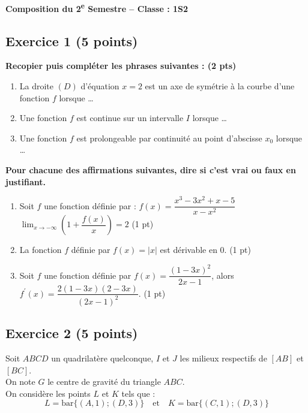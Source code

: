 \documentclass[12pt,a4paper]{article}
\begin{document}
\begin{center}
    \large\textbf{Composition du 2\textsuperscript{e} Semestre -- Classe : 1S2}
\end{center}

\hrulefill

\subsection*{Exercice 1 \hfill (5 points)}

\noindent\textbf{Recopier puis compléter les phrases suivantes : (2 pts)}
\begin{enumerate}
    \item[a)] La droite $(D)$ d'équation $x=2$ est un axe de symétrie à la courbe d'une fonction $f$ lorsque \dots
    \item[b)] Une fonction $f$ est continue sur un intervalle $I$ lorsque \dots
    \item[c)] Une fonction $f$ est prolongeable par continuité au point d'abscisse $x_{0}$ lorsque \dots
\end{enumerate}

\noindent\textbf{Pour chacune des affirmations suivantes, dire si c'est vrai ou faux en justifiant.}
\begin{enumerate}
    \item[\textbf{1.}] Soit $f$ une fonction définie par : $f(x)=\dfrac{x^{3}-3x^{2}+x-5}{x-x^{2}}$ \\
    $\lim_{x\rightarrow-\infty}\left(1+\dfrac{f(x)}{x}\right)=2$ \hfill (1 pt)
    
    \item[\textbf{2.}] La fonction $f$ définie par $f(x)=|x|$ est dérivable en 0. \hfill (1 pt)
    
    \item[\textbf{3.}] Soit $f$ une fonction définie par $f(x)=\dfrac{(1-3x)^{2}}{2x-1}$, alors $f^{\prime}(x)=\dfrac{2(1-3x)(2-3x)}{(2x-1)^{2}}$. \hfill (1 pt)
\end{enumerate}

\smallbreak
\hrulefill
\smallbreak

\subsection*{Exercice 2 \hfill (5 points)}

Soit $ABCD$ un quadrilatère quelconque, $I$ et $J$ les milieux respectifs de $[AB]$ et $[BC]$.\\
On note $G$ le centre de gravité du triangle $ABC$.\\
On considère les points $L$ et $K$ tels que :
\[ L=\text{bar}\{(A,1);(D,3)\} \quad \text{et} \quad K=\text{bar}\{(C,1);(D,3)\} \]
\end{document}
